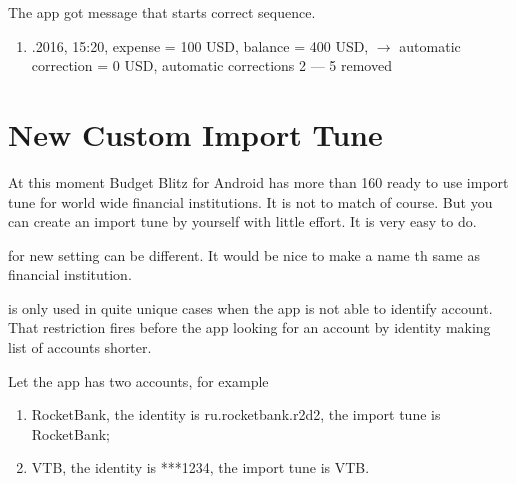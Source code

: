 \documentclass[a4paper,10pt,english]{sphinxmanual}
\begin{document}
\sphinxAtStartPar
The app got message that starts correct sequence.
\begin{enumerate}
%
\setcounter{enumi}{5}
\item {} 
.2016, 15:20, expense = \sphinxhyphen{}100 USD, balance = 400 USD, \(\rightarrow\) automatic correction  = 0 USD, automatic corrections  2 — 5 removed

\end{enumerate}


\section{New Custom Import Tune}
\label{\detokenize{notifications:new-custom-import-tune}}
\sphinxAtStartPar
At this moment Budget Blitz for Android has more than 160 ready to use import tune for world wide financial institutions.
It is not to match of course. But you can create an import tune by yourself with little effort.
It is very easy to do.

\noindent{}

\noindent{}

\noindent{}

\sphinxAtStartPar
{} for new setting can be different. It would be nice to make a name th same as
financial institution.

\sphinxAtStartPar
{} is only used in quite unique cases when the app is not able
to identify account. That restriction fires before the app looking for an account by identity making list
of accounts shorter.

\sphinxAtStartPar
Let the app has two accounts, for example
\begin{enumerate}
%
\item {} 
\sphinxAtStartPar
RocketBank, the identity is ru.rocketbank.r2d2, the import tune is RocketBank;

\item {} 
\sphinxAtStartPar
VTB, the identity is ***1234, the import tune is VTB.

\end{enumerate}
\end{document}
